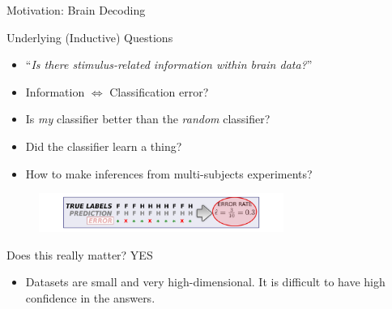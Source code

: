 \documentclass{beamer}
\begin{document}
\begin{frame}{Motivation: Brain Decoding~\cite{haynes2006decoding}}
\end{frame}

\begin{frame}{Underlying (Inductive) Questions}
  \begin{itemize}
  \item ``\emph{Is there stimulus-related information within brain
      data?}''~\cite{pereira2008machine}
  \item Information $\Longleftrightarrow$ Classification error?
  \item Is \emph{my} classifier better than the \emph{random} classifier?
  \item Did the classifier learn a thing?
  \item How to make inferences from multi-subjects experiments?
  \end{itemize}
\begin{figure}
    \centering
    \includegraphics[width=8cm]{prediction_II}
    \label{fig:prediction_I}
  \end{figure}

  \begin{block}{Does this really matter? YES}
    \begin{itemize}
    \item Datasets are small and very high-dimensional. It is
      difficult to have high confidence in the answers.
    \end{itemize}
  \end{block}
\end{frame}
\end{document}

